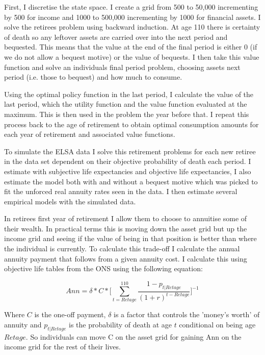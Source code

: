 \documentclass[12pt]{article}
\begin{document}
First, I discretise the state space. I create a grid from 500 to 50,000 incrementing by 500 for income and 1000 to
500,000 incrementing by 1000 for financial assets. I solve the retirees problem using backward induction. At age 110 there is certainty of death so any leftover assets
are carried over into the next period and bequested. This means that the value at the end of the final period is
either 0 (if we do not allow a bequest motive) or the value of bequests. I then take this value function and solve
an individuals final period problem, choosing assets next period (i.e. those to bequest) and how much to consume.

Using the optimal policy function in the last period, I calculate the value of the last period, which the utility
function and the value function evaluated at the maximum. This is then used in the problem the year before that.
I repeat this process back to the age of retirement to obtain optimal consumption amounts for each year of retirement
and associated value functions.

To simulate the ELSA data I solve this retirement problems for each new retiree in the data set dependent on their
objective probability of death each period. I estimate with subjective life expectancies and objective life expectancies,
I also estimate the model both with and without a bequest motive which was picked to fit the unforced real annuity
rates seen in the data. I then estimate several empirical models with the simulated data.

In retirees first year of retirement I allow them to choose to annuitise some of their wealth. In practical terms
this is moving down the asset grid but up the income grid and seeing if the value of being in that position is better
than where the individual is currently. To calculate this trade-off I calculate the annual annuity payment that follows
from a given annuity cost. I calculate this using objective life tables from the ONS using the following equation:

\begin{equation*}
    Ann = \delta * C * \biggl[\sum_{t = Retage}^{110}\frac{1 - p_{t|Retage}}{(1 + r)^{t - Retage}}\biggr]^{-1}
\end{equation*}

Where $C$ is the one-off payment, $\delta$ is a factor that controls the 'money's worth' of annuity and $p_{t|Retage}$
is the probability of death at age $t$ conditional on being age $Retage$. So individuals can move C on the asset grid
for gaining Ann on the income grid for the rest of their lives.
\end{document}
